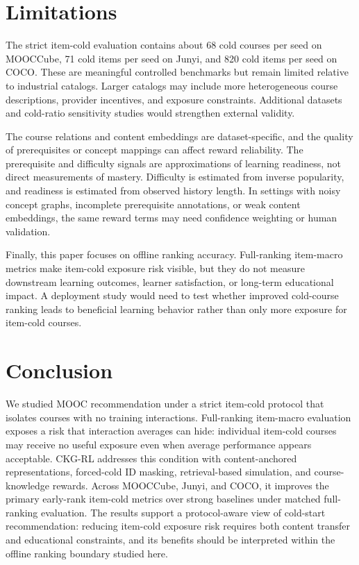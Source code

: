 \documentclass[sigconf,anonymous,review]{acmart}
\begin{document}
\section{Limitations}
The strict item-cold evaluation contains about 68 cold courses per seed on MOOCCube, 71 cold items per seed on Junyi, and 820 cold items per seed on COCO. These are meaningful controlled benchmarks but remain limited relative to industrial catalogs. Larger catalogs may include more heterogeneous course descriptions, provider incentives, and exposure constraints. Additional datasets and cold-ratio sensitivity studies would strengthen external validity.

The course relations and content embeddings are dataset-specific, and the quality of prerequisites or concept mappings can affect reward reliability. The prerequisite and difficulty signals are approximations of learning readiness, not direct measurements of mastery. Difficulty is estimated from inverse popularity, and readiness is estimated from observed history length. In settings with noisy concept graphs, incomplete prerequisite annotations, or weak content embeddings, the same reward terms may need confidence weighting or human validation.

Finally, this paper focuses on offline ranking accuracy. Full-ranking item-macro metrics make item-cold exposure risk visible, but they do not measure downstream learning outcomes, learner satisfaction, or long-term educational impact. A deployment study would need to test whether improved cold-course ranking leads to beneficial learning behavior rather than only more exposure for item-cold courses.

\section{Conclusion}
We studied MOOC recommendation under a strict item-cold protocol that isolates courses with no training interactions. Full-ranking item-macro evaluation exposes a risk that interaction averages can hide: individual item-cold courses may receive no useful exposure even when average performance appears acceptable. CKG-RL addresses this condition with content-anchored representations, forced-cold ID masking, retrieval-based simulation, and course-knowledge rewards. Across MOOCCube, Junyi, and COCO, it improves the primary early-rank item-cold metrics over strong baselines under matched full-ranking evaluation. The results support a protocol-aware view of cold-start recommendation: reducing item-cold exposure risk requires both content transfer and educational constraints, and its benefits should be interpreted within the offline ranking boundary studied here.
\end{document}

